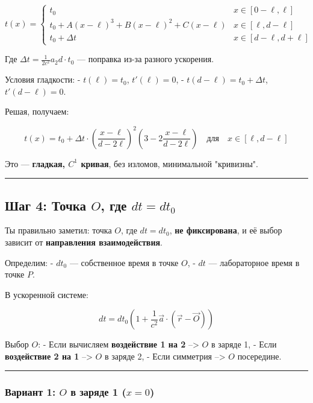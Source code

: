 \documentclass[11pt]{article}
\begin{document}
\[
t(x) =
\begin{cases}
t_0 & x \in [0 - \ell, \ell] \\
t_0 + A(x - \ell)^3 + B(x - \ell)^2 + C(x - \ell) & x \in [\ell, d - \ell] \\
t_0 + \Delta t & x \in [d - \ell, d + \ell]
\end{cases}
\]

Где \(\Delta t = \frac{1}{2c^2} a_2 d \cdot t_0\) --- поправка из-за
разного ускорения.

Условия гладкости: - \(t(\ell) = t_0\), \(t'( \ell) = 0\), -
\(t(d - \ell) = t_0 + \Delta t\), \(t'(d - \ell) = 0\).

Решая, получаем:

\[
t(x) = t_0 + \Delta t \cdot \left( \frac{x - \ell}{d - 2\ell} \right)^2 \left( 3 - 2 \frac{x - \ell}{d - 2\ell} \right)
\quad \text{для} \quad x \in [\ell, d - \ell]
\]

Это --- \textbf{гладкая, \(C^1\) кривая}, без изломов, минимальной
"кривизны".

\begin{center}\rule{0.5\linewidth}{\linethickness}\end{center}

\subsection{\texorpdfstring{ Шаг 4: Точка \(O\), где
\(dt = dt_0\)}{ Шаг 4: Точка O, где dt = dt\_0}}

Ты правильно заметил: точка \(O\), где \(dt = dt_0\), \textbf{не
фиксирована}, и её выбор зависит от \textbf{направления взаимодействия}.

Определим: - \(dt_0\) --- собственное время в точке \(O\), - \(dt\) ---
лабораторное время в точке \(P\).

В ускоренной системе:

\[
dt = dt_0 \left( 1 + \frac{1}{c^2} \vec{a} \cdot (\vec{r} - \vec{O}) \right)
\]

 Выбор \(O\): - Если вычисляем \textbf{воздействие 1 на 2} --> \(O\) в
заряде 1, - Если \textbf{воздействие 2 на 1} --> \(O\) в заряде 2, - Если
симметрия --> \(O\) посередине.

\begin{center}\rule{0.5\linewidth}{\linethickness}\end{center}

\subsubsection{\texorpdfstring{ Вариант 1: \(O\) в заряде 1
(\(x = 0\))}{ Вариант 1: O в заряде 1 (x = 0)}}
\end{document}
